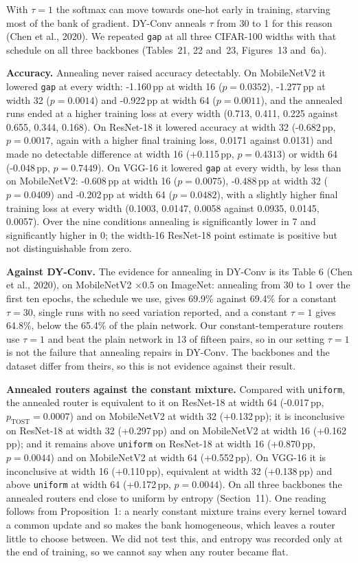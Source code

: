 \documentclass{article}
\begin{document}
With $\tau=1$ the softmax can move towards one-hot early in training,
starving most of the bank of gradient. DY-Conv anneals $\tau$ from 30 to 1
for this reason (Chen et al., 2020). We repeated \texttt{gap} at all
three CIFAR-100 widths with that schedule on all three backbones
(Tables~21, 22 and~23,
Figures~13 and~6a).

\textbf{Accuracy.}  Annealing never raised accuracy detectably. On MobileNetV2 it
lowered \texttt{gap} at every width: -1.160\,pp at width 16
($p=0.0352$), -1.277\,pp at width 32 ($p=0.0014$) and
-0.922\,pp at width 64 ($p=0.0011$), and the annealed runs ended at a
higher training loss at every width (0.713, 0.411, 0.225 against
0.655, 0.344, 0.168). On ResNet-18 it lowered accuracy at width
32 (-0.682\,pp, $p=0.0017$, again with a higher final training loss,
0.0171 against 0.0131) and made no detectable difference at width 16
(+0.115\,pp, $p=0.4313$) or width 64 (-0.048\,pp, $p=0.7449$). On
VGG-16 it lowered \texttt{gap} at every width, by less than on
MobileNetV2: -0.608\,pp at width 16 ($p=0.0075$), -0.488\,pp at
width 32 ($p=0.0409$) and -0.202\,pp at width 64 ($p=0.0482$),
with a slightly higher final training loss at every width (0.1003,
0.0147, 0.0058 against 0.0935, 0.0145, 0.0057). Over the nine
conditions annealing is significantly lower in 7 and
significantly higher in 0; the width-16 ResNet-18 point
estimate is positive but not distinguishable from zero.

\textbf{Against DY-Conv.}  The evidence for annealing in DY-Conv is its
Table 6 (Chen et al., 2020), on MobileNetV2 $\times0.5$ on ImageNet:
annealing from 30 to 1 over the first ten epochs, the schedule we use,
gives 69.9\% against 69.4\% for a constant
$\tau=30$, single runs with no seed variation reported, and a constant
$\tau=1$ gives 64.8\%, below the 65.4\% of the
plain network. Our constant-temperature routers use $\tau=1$ and beat the
plain network in 13 of fifteen pairs, so in our setting $\tau=1$ is
not the failure that annealing repairs in DY-Conv. The backbones and the
dataset differ from theirs, so this is not evidence against their
result.

\textbf{Annealed routers against the constant mixture.}  Compared with
\texttt{uniform}, the annealed router is equivalent to it on ResNet-18 at
width 64 (-0.017\,pp, $p_{\text{TOST}}=0.0007$) and on MobileNetV2 at
width 32 (+0.132\,pp); it is inconclusive on ResNet-18 at width 32
(+0.297\,pp) and on MobileNetV2 at width 16 (+0.162\,pp); and it
remains above \texttt{uniform} on ResNet-18 at width 16 (+0.870\,pp,
$p=0.0044$) and on MobileNetV2 at width 64 (+0.552\,pp). On VGG-16
it is inconclusive at width 16 (+0.110\,pp), equivalent at width 32
(+0.138\,pp) and above \texttt{uniform} at width 64 (+0.172\,pp,
$p=0.0044$). On all three backbones the annealed routers end close
to uniform by entropy (Section~11). One reading follows from
Proposition~1: a nearly constant mixture trains every
kernel toward a common update and so makes the bank homogeneous, which
leaves a router little to choose between. We did not test this, and
entropy was recorded only at the end of training, so we cannot say when
any router became flat.
\end{document}
